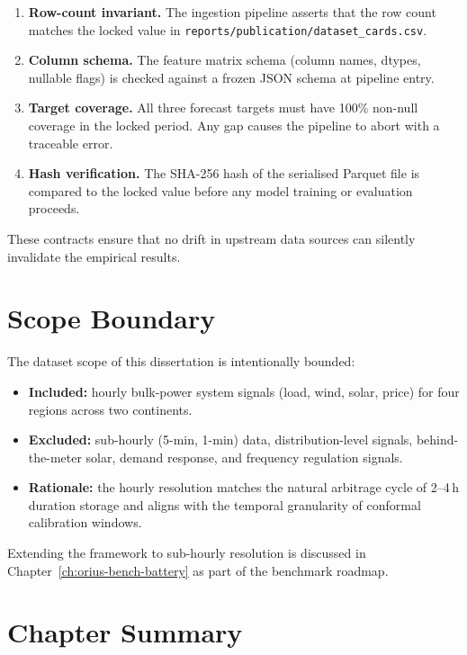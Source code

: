\begin{enumerate}
  \item \textbf{Row-count invariant.}  The ingestion pipeline asserts that
    the row count matches the locked value in
    \texttt{reports/publication/dataset\_cards.csv}.
  \item \textbf{Column schema.}  The feature matrix schema (column names,
    dtypes, nullable flags) is checked against a frozen JSON schema at
    pipeline entry.
  \item \textbf{Target coverage.}  All three forecast targets must have
    100\% non-null coverage in the locked period.  Any gap causes the pipeline
    to abort with a traceable error.
  \item \textbf{Hash verification.}  The SHA-256 hash of the serialised
    Parquet file is compared to the locked value before any model training or
    evaluation proceeds.
\end{enumerate}

These contracts ensure that no drift in upstream data sources can silently
invalidate the empirical results.

\section{Scope Boundary}

The dataset scope of this dissertation is intentionally bounded:

\begin{itemize}
  \item \textbf{Included:} hourly bulk-power system signals (load, wind,
    solar, price) for four regions across two continents.
  \item \textbf{Excluded:} sub-hourly (5-min, 1-min) data, distribution-level
    signals, behind-the-meter solar, demand response, and frequency regulation
    signals.
  \item \textbf{Rationale:} the hourly resolution matches the natural
    arbitrage cycle of 2--4\,h duration storage and aligns with the temporal
    granularity of conformal calibration windows.
\end{itemize}

Extending the framework to sub-hourly resolution is discussed in
Chapter~\ref{ch:orius-bench-battery} as part of the benchmark roadmap.

\section{Chapter Summary}

